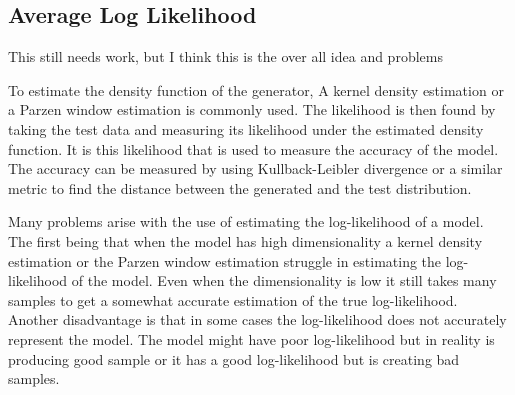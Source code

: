 \subsection{Average Log Likelihood}
\label{sub:Average Log Likelihoodt}

\begin{comment}

 Kernel density estimation and Parzen window estimation are used to estimate the density function of a distribution from samples.
 You take samples from your generator and 
 With the estimated density function defined you can use the Kullback-Leibler divergence or similar metrics to calculate the distance between the generated distribution and distribution of the test data.
 
 It doesn't work well :D lol
 when the data has high dimensionality a Parzen Window struggles to produce the true log-likelihood of a model.(AKA it is not very accurate)
 If the dimesnsionality is low still requires lots of samples to come close to the true log-likelihood.
 
 Because can't really estimate the log-likelihood very well even if dimensions is small.
 
\end{comment}

This still needs work, but I think this is the over all idea and problems

 To estimate the density function of the generator, A kernel density estimation or a Parzen window estimation is commonly used.
 The likelihood is then found by taking the test data and measuring its likelihood under the estimated density function.
 It is this likelihood that is used to measure the accuracy of the model.
 The accuracy can be measured by using Kullback-Leibler divergence or a similar metric to find the distance between the generated and the test distribution.
 
 Many problems arise with the use of estimating the log-likelihood of a model.
 The first being that when the model has high dimensionality a kernel density estimation or the Parzen window estimation struggle in estimating the log-likelihood of the model.
 Even when the dimensionality is low it still takes many samples to get a somewhat accurate estimation of the true log-likelihood.
 Another disadvantage is that in some cases the log-likelihood does not accurately represent the model.
 The model might have poor log-likelihood but in reality is producing good sample or it has a good log-likelihood but is creating bad samples.
 